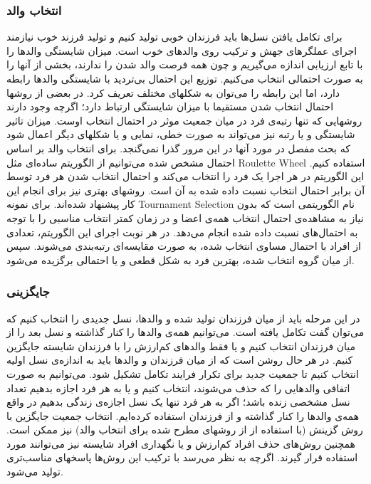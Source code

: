\documentclass{report}
\begin{document}
\subsubsection{انتخاب والد}
برای تکامل یافتن نسل‌ها باید فرزندان خوبی تولید کنیم و تولید فرزند خوب نیازمند اجرای عملگرهای جهش و ترکیب روی والدهای خوب است. میزان شایستگی والدها را با تابع ارزیابی اندازه می‌گیریم و چون همه فرصت والد شدن را ندارند، بخشی از آنها را به صورت احتمالی انتخاب می‌کنیم. توزیع این احتمال بی‌تردید با شایستگی والدها رابطه دارد، اما این رابطه را می‌توان به شکلهای مختلف تعریف کرد.
در بعضی از روشها احتمال انتخاب شدن مستقیما با میزان شایستگی ارتباط دارد؛‌ اگرچه وجود دارند روشهایی که تنها رتبه‌ی فرد در میان جمعیت موثر در احتمال انتخاب اوست. میزان تاثیر شایستگی و یا رتبه نیز می‌تواند به صورت خطی، نمایی و یا شکلهای دیگر اعمال شود که بحث مفصل در مورد آنها در این مرور گذرا نمی‌گنجد.
برای انتخاب والد بر اساس احتمال مشخص شده می‌توانیم از الگوریتم ساده‌ای مثل Roulette Wheel استفاده کنیم. این الگوریتم در هر اجرا یک فرد را انتخاب می‌کند و احتمال انتخاب شدن هر فرد توسط آن برابر احتمال انتخاب نسبت داده شده به آن است. روشهای بهتری نیز برای انجام این کار پیشنهاد شده‌اند. برای نمونه Tournament Selection نام الگوریتمی است که بدون نیاز به مشاهده‌ی احتمال انتخاب همه‌ی اعضا و در زمان کمتر انتخاب مناسبی را با توجه به احتمال‌های نسبت داده شده انجام می‌دهد. در هر نوبت اجرای این الگوریتم، تعدادی از افراد با احتمال مساوی انتخاب شده، به صورت مقایسه‌ای رتبه‌بندی می‌شوند. سپس از میان گروه انتخاب شده، بهترین فرد به شکل قطعی و یا احتمالی برگزیده می‌شود.   

\subsubsection{جایگزینی}
در این مرحله باید از میان فرزندان تولید شده و والدها، نسل جدیدی را انتخاب کنیم که می‌توان گفت تکامل یافته است. می‌توانیم همه‌ی والدها را کنار گذاشته و نسل بعد را از میان فرزندان انتخاب کنیم و یا فقط والدهای کم‌ارزش را با فرزندان شایسته جایگزین کنیم. در هر حال روشن است که از میان فرزندان و والدها باید به اندازه‌ی نسل اولیه انتخاب کنیم تا جمعیت جدید برای تکرار فرایند تکامل تشکیل شود.
می‌توانیم به صورت اتفاقی والدهایی را که حذف می‌شوند، انتخاب کنیم و یا به هر فرد اجازه بدهیم تعداد نسل مشخصی زنده باشد؛ اگر به هر فرد تنها یک نسل اجازه‌ی زندگی بدهیم در واقع همه‌ی والدها را کنار گذاشته و از فرزندان استفاده کرده‌ایم.
انتخاب جمعیت جایگزین با روش گزینش (با استفاده از از روشهای مطرح شده برای انتخاب والد) نیز ممکن است. همچنین روش‌های حذف افراد کم‌ارزش و یا نگهداری افراد شایسته نیز می‌توانند مورد استفاده قرار گیرند. اگرچه به نظر می‌رسد با ترکیب این روش‌ها پاسخهای مناسب‌تری تولید می‌شود.
\end{document}
